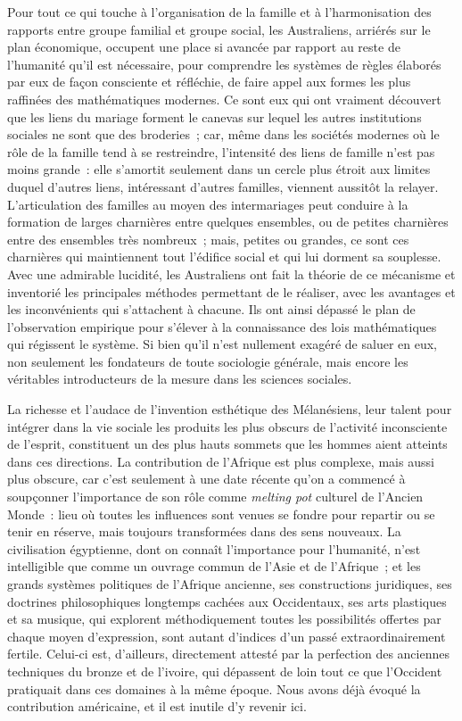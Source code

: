 \documentclass[french,twoside]{book} %
\begin{document}
Pour tout ce qui touche à l’organisation de la famille et à l’harmonisation des rapports entre groupe familial et groupe social, les Australiens, arriérés sur le plan économique, occupent une place si avancée par rapport au reste de l’humanité qu’il est nécessaire, pour comprendre les systèmes de règles élaborés par eux de façon consciente et réfléchie, de faire appel aux formes les plus raffinées des mathématiques modernes. Ce sont eux qui ont vraiment découvert que les liens du mariage forment le canevas sur lequel les autres institutions sociales ne sont que des broderies ; car, même dans les sociétés modernes où le rôle de la famille tend à se restreindre, l’intensité des liens de famille n’est pas moins grande : elle s’amortit seulement dans un cercle plus étroit aux limites duquel d’autres liens, intéressant d’autres familles, viennent aussitôt la relayer. L’articulation des familles au moyen des intermariages peut conduire à la formation de larges charnières entre quelques ensembles, ou de petites charnières entre des ensembles très nombreux ; mais, petites ou grandes, ce sont ces charnières qui maintiennent tout l’édifice social et qui lui dorment sa souplesse. Avec une admirable lucidité, les Australiens ont fait la théorie de ce mécanisme et inventorié les principales méthodes permettant de le réaliser, avec les avantages et les inconvénients qui s’attachent à chacune. Ils ont ainsi dépassé le plan de l’observation empirique pour s’élever à la connaissance des lois mathématiques qui régissent le système. Si bien qu’il n’est nullement exagéré de saluer en eux, non seulement les fondateurs de toute sociologie générale, mais encore les véritables introducteurs de la mesure dans les sciences sociales.\par
La richesse et l’audace de l’invention esthétique des Mélanésiens, leur talent pour intégrer dans la vie sociale les produits les plus obscurs de l’activité inconsciente de l’esprit, constituent un des plus hauts sommets que les hommes aient atteints dans ces directions. La contribution de l’Afrique est plus complexe, mais aussi plus obscure, car c’est seulement à une date récente qu’on a commencé à soupçonner l’importance de son rôle comme \emph{melting pot} culturel de l’Ancien Monde : lieu où toutes les influences sont venues se fondre pour repartir ou se tenir en réserve, mais toujours transformées dans des sens nouveaux. La civilisation égyptienne, dont on connaît l’importance pour l’humanité, n’est intelligible que comme un ouvrage commun de l’Asie et de l’Afrique ; et les grands systèmes politiques de l’Afrique ancienne, ses constructions juridiques, ses doctrines philosophiques longtemps cachées aux Occidentaux, ses arts plastiques et sa musique, qui explorent méthodiquement toutes les possibilités offertes par chaque moyen d’expression, sont autant d’indices d’un passé extraordinairement fertile. Celui-ci est, d’ailleurs, directement attesté par la perfection des anciennes techniques du bronze et de l’ivoire, qui dépassent de loin tout ce que l’Occident pratiquait dans ces domaines à la même époque. Nous avons déjà évoqué la contribution américaine, et il est inutile d’y revenir ici.\par
\end{document}
